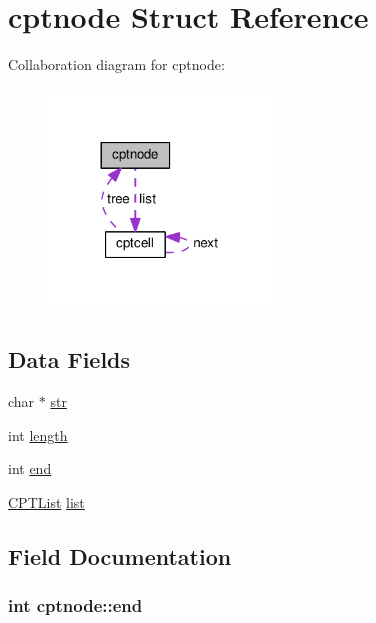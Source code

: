\hypertarget{structcptnode}{}\section{cptnode Struct Reference}
\label{structcptnode}


Collaboration diagram for cptnode\+:\nopagebreak
\begin{figure}[H]
\begin{center}
\leavevmode
\includegraphics[width=168pt]{structcptnode__coll__graph}
\end{center}
\end{figure}
\subsection*{Data Fields}
\begin{DoxyCompactItemize}
\item 
char $\ast$ \hyperlink{structcptnode_a0f39bf735e3c110c5559c56a2865e3e6}{str}
\item 
int \hyperlink{structcptnode_a18110f6aa5dcbadb7233fb49ee931ee2}{length}
\item 
int \hyperlink{structcptnode_aa3b17740356cb0b60a9bac4f1ee7534d}{end}
\item 
\hyperlink{cpt__string_8c_ab32bc138599911e22c2be201414b53e7}{C\+P\+T\+List} \hyperlink{structcptnode_a957239c445f0b92b306830b91603b8e0}{list}
\end{DoxyCompactItemize}


\subsection{Field Documentation}
\subsubsection[{\texorpdfstring{end}{end}}]{\setlength{\rightskip}{0pt plus 5cm}int cptnode\+::end}\hypertarget{structcptnode_aa3b17740356cb0b60a9bac4f1ee7534d}{}\label{structcptnode_aa3b17740356cb0b60a9bac4f1ee7534d}
